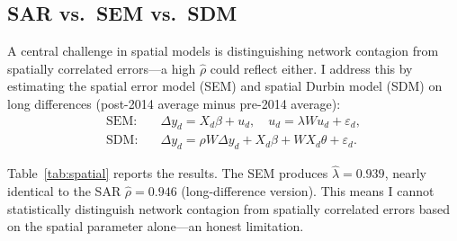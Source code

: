 \documentclass[12pt]{article}
\begin{document}
\subsection{SAR vs.\ SEM vs.\ SDM}
\label{sec:sar_sem}

A central challenge in spatial models is distinguishing network contagion from spatially correlated errors---a high $\hat{\rho}$ could reflect either. I address this by estimating the spatial error model (SEM) and spatial Durbin model (SDM) on long differences (post-2014 average minus pre-2014 average):
\begin{align}
\text{SEM:} \quad & \Delta y_d = X_d \beta + u_d, \quad u_d = \lambda W u_d + \varepsilon_d, \label{eq:sem} \\
\text{SDM:} \quad & \Delta y_d = \rho W \Delta y_d + X_d \beta + W X_d \theta + \varepsilon_d. \label{eq:sdm}
\end{align}

Table~\ref{tab:spatial} reports the results. The SEM produces $\hat{\lambda} = 0.939$, nearly identical to the SAR $\hat{\rho} = 0.946$ (long-difference version). This means I cannot statistically distinguish network contagion from spatially correlated errors based on the spatial parameter alone---an honest limitation.
\end{document}
